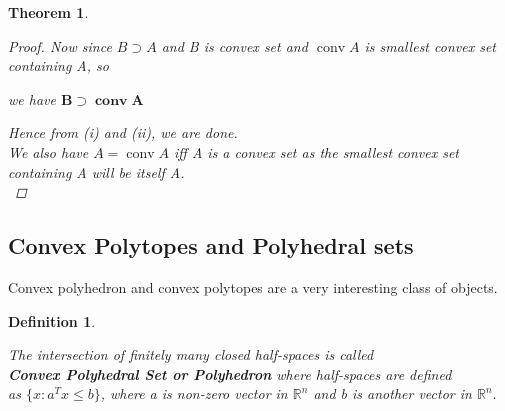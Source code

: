 \documentclass[oneside]{book}
\newtheorem{theorem}{Theorem}[section]
\newtheorem{mydef}{Definition}[section]
\begin{document}
\begin{theorem}
\begin{proof}
			Now since $ B \supset A $ and B is convex set and $\operatorname{conv} A $ is smallest convex set containing A, so
			
			we have  $ \mathbf{B} \supset \mathbf{\operatorname{conv} A}  $ \par
			Hence from (i) and (ii), we are done. \\
			We also have $A = \operatorname{conv} A$ iff A is a convex set as the smallest convex set containing A will be itself A. \\
			
		\end{proof}
		
	\end{theorem}
	
	
	
	
	
	
	
	
	
	
	
	
	
	
	
	
	
	
	
	
	
	
	
	
	
	
	
	
	
	
	
	
	
	
	\subsection{ Convex Polytopes and Polyhedral sets } \label{ss:16}
	Convex polyhedron and convex polytopes are a very interesting class of objects. 
	\begin{mydef} \label{d:5}
		
		The intersection of finitely many closed half-spaces is called \\
		\textbf{ Convex Polyhedral Set  or Polyhedron}
		where half-spaces are defined \\
		as $\{ x : a^{T}x \leq b\} $,  where a is non-zero vector in $\mathbb{R}^n$ and b is another vector in  $\mathbb{R}^n.$  
		
		
	\end{mydef}
	
\end{document}
